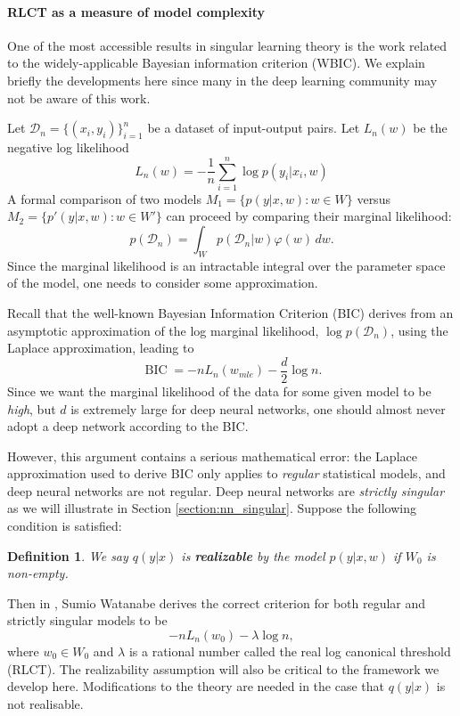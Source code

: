 \documentclass{article} %
\newtheorem{definition}{Definition}
\begin{document}
\paragraph{RLCT as a measure of model complexity}
One of the most accessible results in singular learning theory is the work related to the widely-applicable Bayesian information criterion (WBIC). We explain briefly the developments here since many in the deep learning community may not be aware of this work.

Let $\mathcal D_n =  \{(x_i,y_i)\}_{i=1}^n$ be a dataset of input-output pairs.  
Let $L_n(w)$ be the negative log likelihood
\[
L_n(w) = -\frac{1}{n} \sum_{i=1}^n \log p(y_i |x_i, w)
\]
A formal comparison of two models  $M_1=\{p(y|x,w): w \in W\}$ versus $M_2=\{p'(y|x,w): w \in W'\}$ can proceed by comparing their marginal likelihood:
$$
p(\mathcal D_n) = \int_W p(\mathcal D_n|w) \varphi(w) \,dw.
$$
Since the marginal likelihood is an intractable integral over the parameter space of the model, one needs to consider some approximation.

Recall that the well-known Bayesian Information Criterion (BIC) derives from an asymptotic approximation of the log marginal likelihood, $\log p(\mathcal D_n)$, using the Laplace approximation, leading to
\[
\operatorname{BIC} = -nL_n( w_{mle}) - \frac{d}{2} \log n.
\]
Since we want the marginal likelihood of the data for some given model to be \textit{high}, but $d$ is extremely large for deep neural networks, one should almost never adopt a deep network according to the BIC. 

However, this argument contains a serious mathematical error: the Laplace approximation used to derive BIC only applies to \emph{regular} statistical models, and deep neural networks are not regular. Deep neural networks are \textit{strictly singular} as we will illustrate in Section \ref{section:nn_singular}. Suppose the following condition is satisfied:
\begin{definition}
	We say $q(y|x)$ is \textbf{realizable} by the model $p(y|x,w)$ if $W_0$ is non-empty.
\end{definition}
Then in \citep{watanabe_algebraic_2009}, Sumio Watanabe derives the correct criterion for both regular and strictly singular models to be 
\begin{equation}
-nL_n(w_0) - \lambda \log n,
\label{logmarginal_rlct}
\end{equation}
where $w_0 \in W_0$ and $\lambda$ is a rational number called the real log canonical threshold (RLCT). 
The realizability assumption will also be critical to the framework we develop here. Modifications to the theory are needed in the case that $q(y|x)$ is not realisable.
\end{document}

